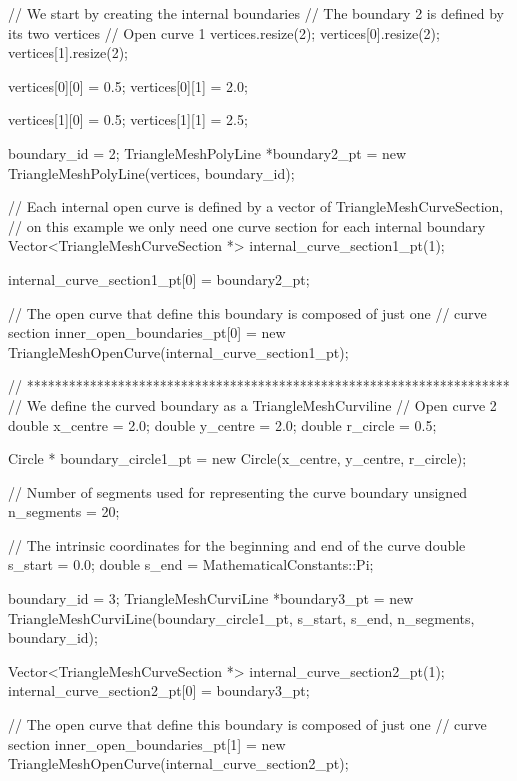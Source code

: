  
\begin{DoxyCodeInclude}
  \textcolor{comment}{// We start by creating the internal boundaries}
  \textcolor{comment}{// The boundary 2 is defined by its two vertices}
  \textcolor{comment}{// Open curve 1}
  vertices.resize(2);
  vertices[0].resize(2);
  vertices[1].resize(2);

  vertices[0][0] = 0.5;
  vertices[0][1] = 2.0;

  vertices[1][0] = 0.5;
  vertices[1][1] = 2.5;

  boundary\_id = 2;
  TriangleMeshPolyLine *boundary2\_pt =
    \textcolor{keyword}{new} TriangleMeshPolyLine(vertices, boundary\_id);

  \textcolor{comment}{// Each internal open curve is defined by a vector of TriangleMeshCurveSection,}
  \textcolor{comment}{// on this example we only need one curve section for each internal boundary}
  Vector<TriangleMeshCurveSection *> internal\_curve\_section1\_pt(1);

  internal\_curve\_section1\_pt[0] = boundary2\_pt;

  \textcolor{comment}{// The open curve that define this boundary is composed of just one}
  \textcolor{comment}{// curve section}
  inner\_open\_boundaries\_pt[0] =
      \textcolor{keyword}{new} TriangleMeshOpenCurve(internal\_curve\_section1\_pt);

  \textcolor{comment}{// *********************************************************************}
  \textcolor{comment}{// We define the curved boundary as a TriangleMeshCurviline}
  \textcolor{comment}{// Open curve 2}
  \textcolor{keywordtype}{double} x\_centre = 2.0;
  \textcolor{keywordtype}{double} y\_centre = 2.0;
  \textcolor{keywordtype}{double} r\_circle = 0.5;

  Circle * boundary\_circle1\_pt = \textcolor{keyword}{new} Circle(x\_centre, y\_centre, r\_circle);

  \textcolor{comment}{// Number of segments used for representing the curve boundary}
  \textcolor{keywordtype}{unsigned} n\_segments = 20;

  \textcolor{comment}{// The intrinsic coordinates for the beginning and end of the curve}
  \textcolor{keywordtype}{double} s\_start = 0.0;
  \textcolor{keywordtype}{double} s\_end = MathematicalConstants::Pi;

  boundary\_id = 3;
  TriangleMeshCurviLine *boundary3\_pt =
      \textcolor{keyword}{new} TriangleMeshCurviLine(boundary\_circle1\_pt,
          s\_start,
          s\_end,
          n\_segments,
          boundary\_id);

  Vector<TriangleMeshCurveSection *> internal\_curve\_section2\_pt(1);
  internal\_curve\_section2\_pt[0] = boundary3\_pt;

  \textcolor{comment}{// The open curve that define this boundary is composed of just one}
  \textcolor{comment}{// curve section}
  inner\_open\_boundaries\_pt[1] =
      \textcolor{keyword}{new} TriangleMeshOpenCurve(internal\_curve\_section2\_pt);

\end{DoxyCodeInclude}






